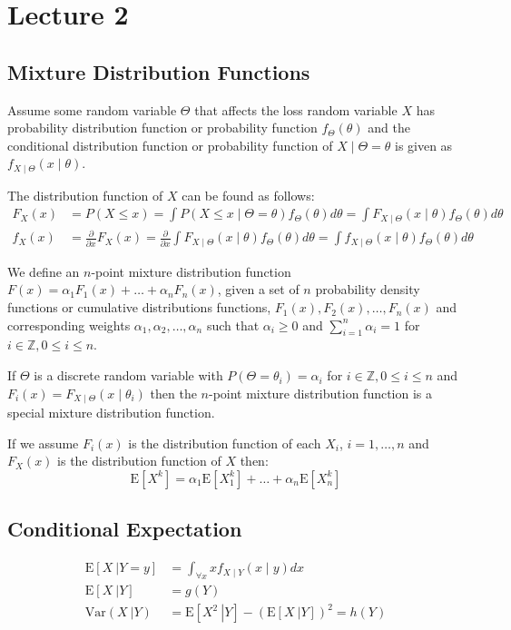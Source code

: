 \documentclass[english,12pt]{article}
\theoremstyle{plain}
\theoremstyle{definition}
\theoremstyle{definition} %
\newcommand{\ex}[1]{\mbox{E} \left[ #1 \right]}
\newcommand{\condex}[2]{\mbox{E} \left[ \left. #1 \ \right\vert \left. #2 \right. \right]}
\newcommand{\condvar}[2]{\mbox{Var} \left( \left. #1 \ \right\lvert \left. #2 \right. \right)}
\begin{document}
\section*{Lecture 2}
\subsection{Mixture Distribution Functions}
Assume some random variable $\Theta$ that affects the loss random variable $X$ has probability distribution function or probability function $f_\Theta(\theta)$ and the conditional distribution function or probability function of $X\mid\Theta=\theta$ is given as $f_{X\mid\Theta}(x\mid\theta)$.

The distribution function of $X$ can be found as follows:
\begin{align*}
F_X(x)&=P(X\le x)
=\int P(X\le x\mid\Theta=\theta)f_\Theta(\theta)d\theta
=\int F_{X\mid\Theta}(x\mid\theta)f_\Theta(\theta)d\theta\\
f_X(x)&=\frac{\partial}{\partial x}F_X(x)
=\frac{\partial}{\partial x}\int F_{X\mid\Theta}(x\mid\theta)f_\Theta(\theta)d\theta
=\int f_{X\mid\Theta}(x\mid\theta)f_\Theta(\theta)d\theta
\end{align*}

We define an $n$-point mixture distribution function $F(x)=\alpha_1F_1(x)+\ldots+\alpha_nF_n(x)$, given a set of $n$ probability density functions or cumulative distributions functions, $F_1(x),F_2(x),\ldots, F_n(x)$ and corresponding weights $\alpha_1,\alpha_2,\ldots,\alpha_n$ such that $\alpha_i\ge 0$ and $\sum\limits_{i=1}^n\alpha_i=1$ for $i\in\mathbb{Z}, 0\le i\le n$.

If $\Theta$ is a discrete random variable with $P(\Theta=\theta_i)=\alpha_i$ for $i\in\mathbb{Z}, 0\le i\le n$ and $F_i(x)=F_{X\mid\Theta}(x\mid\theta_i)$ then the $n$-point mixture distribution function is a special mixture distribution function.

If we assume $F_i(x)$ is the distribution function of each $X_i$, $i=1,\ldots,n$ and $F_X(x)$ is the distribution function of $X$ then:
\[\ex{X^k}=\alpha_1\ex{X_1^k}+\ldots+\alpha_n\ex{X_n^k}\]

\subsection{Conditional Expectation}
\begin{align*}
\condex{X}{Y=y}&=\int_{\forall x}xf_{X\mid Y}(x\mid y)dx\\
\condex{X}{Y}&=g(Y)\\
\condvar{X}{Y}&=\condex{X^2}{Y}-(\condex{X}{Y})^2=h(Y)
\end{align*}
\end{document}
